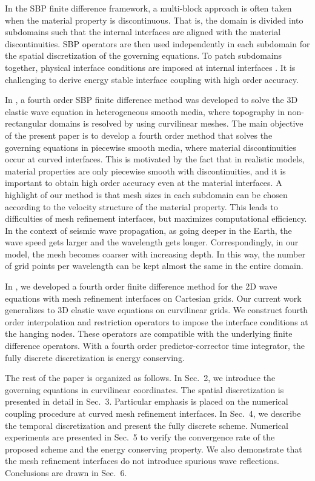 In the SBP finite difference framework, a multi-block approach is often taken when the material property is discontinuous. That is, the domain is divided into subdomains such that the internal interfaces are aligned with the material discontinuities. SBP operators are then used independently in each subdomain for the spatial discretization of the governing equations. To patch subdomains together, physical interface conditions are imposed at internal interfaces \cite{Almquist2019,duru2014stable}. It is challenging to derive energy stable interface coupling with high order accuracy. 

In \cite{petersson2015wave}, a fourth order SBP finite difference method was developed to solve the 3D elastic wave equation in heterogeneous smooth media, where topography in non-rectangular domains is resolved by using curvilinear meshes. The main objective of the present paper is to develop a fourth order method that solves the governing equations in piecewise smooth media, where material discontinuities occur at curved interfaces.   This is motivated by the fact that in realistic models, material properties are only piecewise smooth with discontinuities, and it is important to obtain high order accuracy even at the material interfaces. A highlight of our method is that mesh sizes in each subdomain can be chosen according to the velocity structure of the material property. This leads to difficulties of mesh refinement interfaces, but maximizes computational efficiency. In the context of seismic wave propagation, as going deeper in the Earth, the wave speed gets larger and the wavelength gets longer. Correspondingly, in our model, the mesh becomes coarser with increasing depth. In this way, the number of grid points per wavelength can be kept almost the same in the entire domain. 

In \cite{wang2018fourth}, we developed a fourth order finite difference method for the 2D wave equations with mesh refinement interfaces on Cartesian grids. Our current work generalizes to 3D elastic wave equations on curvilinear grids. We construct fourth order interpolation and restriction operators to impose the interface conditions at the hanging nodes. These operators are compatible with the underlying finite difference operators. With a fourth order predictor-corrector time integrator, the fully discrete discretization is energy conserving. 

The rest of the paper is organized as follows. In Sec.~2, we introduce the governing equations in curvilinear coordinates. The spatial discretization is presented in detail in Sec.~3. Particular emphasis is placed on the numerical coupling procedure at curved mesh refinement interfaces. In Sec.~4, we describe the temporal discretization and present the fully discrete scheme. Numerical experiments are presented in Sec.~5 to verify the convergence rate of the proposed scheme and the energy conserving property. We also demonstrate that the mesh refinement interfaces do not introduce spurious wave reflections. Conclusions are drawn in Sec.~6. 
